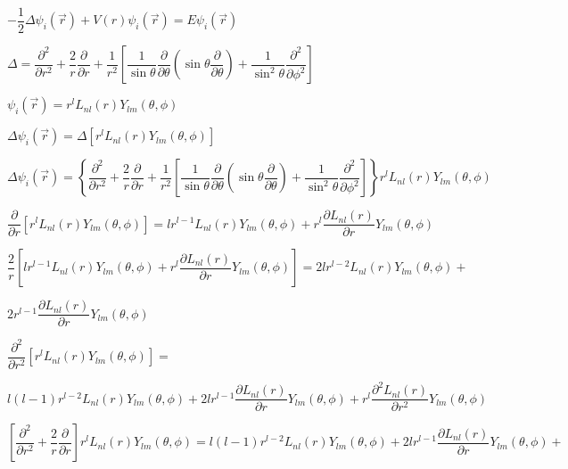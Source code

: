 \documentclass{jarticle}%
\begin{document}
$-\dfrac{1}{2}\Delta\psi_{i}\left(  \vec{r}\right)  +V\left(  r\right)
\psi_{i}\left(  \vec{r}\right)  =E\psi_{i}\left(  \vec{r}\right)  $

$\Delta=\dfrac{\partial^{2}}{\partial r^{2}}+\dfrac{2}{r}\dfrac{\partial
}{\partial r}+\dfrac{1}{r^{2}}\left[  \dfrac{1}{\sin\theta}\dfrac{\partial
}{\partial\theta}\left(  \sin\theta\dfrac{\partial}{\partial\theta}\right)
+\dfrac{1}{\sin^{2}\theta}\dfrac{\partial^{2}}{\partial\phi^{2}}\right]  $

$\psi_{i}\left(  \vec{r}\right)  =r^{l}L_{nl}\left(  r\right)  Y_{lm}\left(
\theta,\phi\right)  $

$\Delta\psi_{i}\left(  \vec{r}\right)  =\Delta\left[  r^{l}L_{nl}\left(
r\right)  Y_{lm}\left(  \theta,\phi\right)  \right]  $

$\Delta\psi_{i}\left(  \vec{r}\right)  =\left\{  \dfrac{\partial^{2}}{\partial
r^{2}}+\dfrac{2}{r}\dfrac{\partial}{\partial r}+\dfrac{1}{r^{2}}\left[
\dfrac{1}{\sin\theta}\dfrac{\partial}{\partial\theta}\left(  \sin\theta
\dfrac{\partial}{\partial\theta}\right)  +\dfrac{1}{\sin^{2}\theta}%
\dfrac{\partial^{2}}{\partial\phi^{2}}\right]  \right\}  r^{l}L_{nl}\left(
r\right)  Y_{lm}\left(  \theta,\phi\right)  $

$\dfrac{\partial}{\partial r}\left[  r^{l}L_{nl}\left(  r\right)
Y_{lm}\left(  \theta,\phi\right)  \right]  =lr^{l-1}L_{nl}\left(  r\right)
Y_{lm}\left(  \theta,\phi\right)  +r^{l}\dfrac{\partial L_{nl}\left(
r\right)  }{\partial r}Y_{lm}\left(  \theta,\phi\right)  $

$\dfrac{2}{r}\left[  lr^{l-1}L_{nl}\left(  r\right)  Y_{lm}\left(  \theta
,\phi\right)  +r^{l}\dfrac{\partial L_{nl}\left(  r\right)  }{\partial
r}Y_{lm}\left(  \theta,\phi\right)  \right]  =2lr^{l-2}L_{nl}\left(  r\right)
Y_{lm}\left(  \theta,\phi\right)  +$

$2r^{l-1}\dfrac{\partial L_{nl}\left(  r\right)  }{\partial r}Y_{lm}\left(
\theta,\phi\right)  $

$\dfrac{\partial^{2}}{\partial r^{2}}\left[  r^{l}L_{nl}\left(  r\right)
Y_{lm}\left(  \theta,\phi\right)  \right]  =$

$l\left(  l-1\right)  r^{l-2}L_{nl}\left(  r\right)  Y_{lm}\left(  \theta
,\phi\right)  +2lr^{l-1}\dfrac{\partial L_{nl}\left(  r\right)  }{\partial
r}Y_{lm}\left(  \theta,\phi\right)  +r^{l}\dfrac{\partial^{2}L_{nl}\left(
r\right)  }{\partial r^{2}}Y_{lm}\left(  \theta,\phi\right)  $

$\left[  \dfrac{\partial^{2}}{\partial r^{2}}+\dfrac{2}{r}\dfrac{\partial
}{\partial r}\right]  r^{l}L_{nl}\left(  r\right)  Y_{lm}\left(  \theta
,\phi\right)  =l\left(  l-1\right)  r^{l-2}L_{nl}\left(  r\right)
Y_{lm}\left(  \theta,\phi\right)  +2lr^{l-1}\dfrac{\partial L_{nl}\left(
r\right)  }{\partial r}Y_{lm}\left(  \theta,\phi\right)  +$
\end{document}
